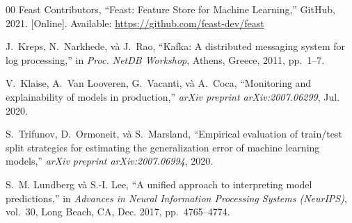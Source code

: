 \documentclass[conference]{IEEEtran}
\begin{document}
\begin{thebibliography}{00}
Feast Contributors,
``Feast: Feature Store for Machine Learning,''
GitHub, 2021.
[Online]. Available: \url{https://github.com/feast-dev/feast}

J.~Kreps, N.~Narkhede, và J.~Rao,
``Kafka: A distributed messaging system for log processing,''
in \textit{Proc. NetDB Workshop}, Athens, Greece, 2011, pp.~1--7.

V.~Klaise, A.~Van Looveren, G.~Vacanti, và A.~Coca,
``Monitoring and explainability of models in production,''
\textit{arXiv preprint arXiv:2007.06299}, Jul. 2020.

S.~Trifunov, D.~Ormoneit, và S.~Marsland,
``Empirical evaluation of train/test split strategies for estimating the
generalization error of machine learning models,''
\textit{arXiv preprint arXiv:2007.06994}, 2020.

S.~M. Lundberg và S.-I. Lee,
``A unified approach to interpreting model predictions,''
in \textit{Advances in Neural Information Processing Systems (NeurIPS)},
vol.~30, Long Beach, CA, Dec. 2017, pp.~4765--4774.

\end{thebibliography}
\end{document}
